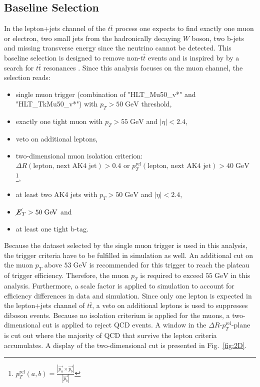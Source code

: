 \subsection{Baseline Selection}
\label{sec:PreSel}
	In the lepton+jets channel of the $t\bar{t}$ process one expects to find exactly one muon or electron, two small jets from the hadronically decaying $W$ boson, two b-jets and missing transverse energy since the neutrino cannot be detected. This baseline selection is designed to remove non-$t\bar{t}$ events and is inspired by by a search for $t\bar{t}$ resonances \cite{Zprime}. Since this analysis focuses on the muon channel, the selection reads:
	\begin{itemize}
	\item single muon trigger (combination of "HLT\_Mu50\_v*" and "HLT\_TkMu50\_v*") with $p_T > 50\;\text{GeV}$ threshold,
	\item exactly one tight muon with $p_T > 55\;\text{GeV}$ and $|\eta| < 2.4$,
	\item veto on additional leptons,
	\item two-dimensional muon isolation criterion: \\ $\Delta R(\text{lepton, next AK4 jet}) > 0.4$ or $p_T^{\text{rel}}(\text{lepton, next AK4 jet}) > 40\;\text{GeV}$ \footnote{$p_T^{\text{rel}}(a,b) = \frac{|\vec{p_a} \times \vec{p_b}|}{|\vec{p_b}|}$},
	\item at least two AK4 jets with $p_T > 50\;\text{GeV}$ and $|\eta| < 2.4$,
	\item $\cancel{E}_T > 50\;\text{GeV}$ and
	\item at least one tight b-tag.
	\end{itemize}
	Because the dataset selected by the single muon trigger is used in this analysis, the trigger criteria have to be fulfilled in simulation as well. An additional cut on the muon $p_T$ above $53\;\text{GeV}$ is recommended \cite{MuonID} for this trigger to reach the plateau of trigger efficiency. Therefore, the muon $p_T$ is required to exceed $55\;\text{GeV}$ in this analysis. Furthermore, a scale factor is applied to simulation to account for efficiency differences in data and simulation. Since only one lepton is expected in the lepton+jets channel of $t\bar{t}$, a veto on additional leptons is used to suppresses diboson events. Because no isolation criterium is applied for the muons, a two-dimensional cut is applied to reject QCD events. A window in the $\Delta R$-$p_T^{\text{rel}}$-plane is cut out where the majority of QCD that survive the lepton criteria accumulates. A display of the two-dimensional cut is presented in Fig.~\ref{fig:2D}. \\
